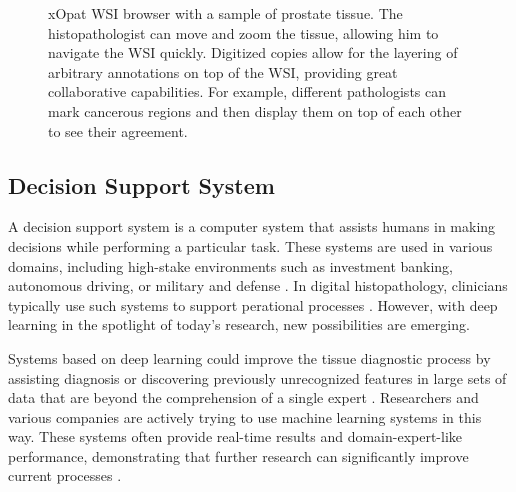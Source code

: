 \begin{figure}
    \begin{center}
    \begin{minipage}{0.90\textwidth}
    \end{minipage}
    \caption{xOpat \cite{xopat} WSI browser with a sample of prostate tissue. The histopathologist can move and zoom the tissue, allowing him to navigate the WSI quickly. Digitized copies allow for the layering of arbitrary annotations on top of the WSI, providing great collaborative capabilities. For example, different pathologists can mark cancerous regions and then display them on top of each other to see their agreement.}
    \label{fig:xopat}
    \end{center}
\end{figure}

\subsection*{Decision Support System}

A decision support system is a computer system that assists humans in making decisions while performing a particular task.
These systems are used in various domains, including high-stake environments such as investment banking, autonomous driving, or military and defense \cite{dss-finance, dss-autonomous-driving, dss-military-and-defense}. In digital histopathology, clinicians typically use such systems to support perational processes \cite{digital-histopathology-process}.
However, with deep learning in the spotlight of today's research, new possibilities are emerging.

Systems based on deep learning could improve the tissue diagnostic process by assisting diagnosis or discovering previously unrecognized features in large sets of data that are beyond the comprehension of a single expert \cite{dss-digital-histopathology}. 
Researchers and various companies are actively trying to use machine learning systems in this way. 
These systems often provide real-time results and domain-expert-like performance, demonstrating that further research can significantly improve current processes \cite{deep-learning-in-histopathology}.

